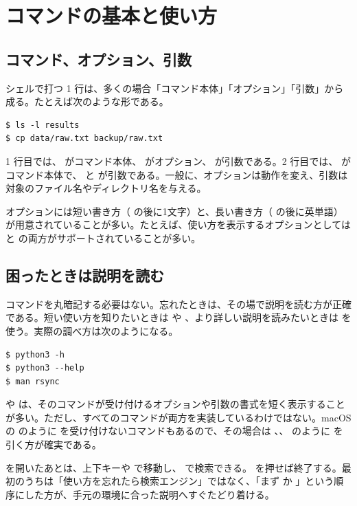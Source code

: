 \section{コマンドの基本と使い方}

\subsection{コマンド、オプション、引数}

シェルで打つ 1 行は、多くの場合「コマンド本体」「オプション」「引数」から成る。たとえば次のような形である。

\begin{lstlisting}[numbers=none, xleftmargin=2\zw]
$ ls -l results
$ cp data/raw.txt backup/raw.txt
\end{lstlisting}

1 行目では、 がコマンド本体、 がオプション、 が引数である。2 行目では、 がコマンド本体で、 と  が引数である。一般に、オプションは動作を変え、引数は対象のファイル名やディレクトリ名を与える。

オプションには短い書き方（\code{-} の後に1文字）と、長い書き方（\code{--} の後に英単語）が用意されていることが多い。たとえば、使い方を表示するオプションとしては  と  の両方がサポートされていることが多い。

\subsection{困ったときは説明を読む}

コマンドを丸暗記する必要はない。忘れたときは、その場で説明を読む方が正確である。短い使い方を知りたいときは  や 、より詳しい説明を読みたいときは  を使う。実際の調べ方は次のようになる。

\begin{lstlisting}[numbers=none, xleftmargin=2\zw]
$ python3 -h
$ python3 --help
$ man rsync
\end{lstlisting}

 や  は、そのコマンドが受け付けるオプションや引数の書式を短く表示することが多い。ただし、すべてのコマンドが両方を実装しているわけではない。macOS の  のように  を受け付けないコマンドもあるので、その場合は 、、 のように  を引く方が確実である。

 を開いたあとは、上下キーや  で移動し、 で検索できる。 を押せば終了する。最初のうちは「使い方を忘れたら検索エンジン」ではなく、「まず  か 」という順序にした方が、手元の環境に合った説明へすぐたどり着ける。


